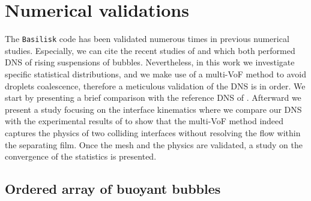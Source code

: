 \section{Numerical validations}
\label{ap:validation}
The \texttt{Basilisk} code has been validated numerous times in previous numerical studies. 
Especially, we can cite the recent studies of \citet{innocenti2020direct} and \citet{hidman2023assessing} which both performed DNS of rising suspensions of bubbles. 
Nevertheless, in this work we investigate specific statistical distributions,
and we make use of a multi-VoF method to avoid droplets coalescence, therefore a meticulous validation of the DNS is in order. 
We start by presenting a brief comparison with the reference DNS of \citet{esmaeeli1999direct}. 
Afterward we present a study focusing on the interface kinematics   where we compare our DNS with the experimental results of \citet{mohamed2003drop} to show that the multi-VoF method indeed captures the physics of two colliding interfaces without resolving the flow within the separating film. 
Once the mesh and the physics are validated, a study on the convergence of the statistics is presented. 

\subsection{Ordered array of buoyant bubbles}

